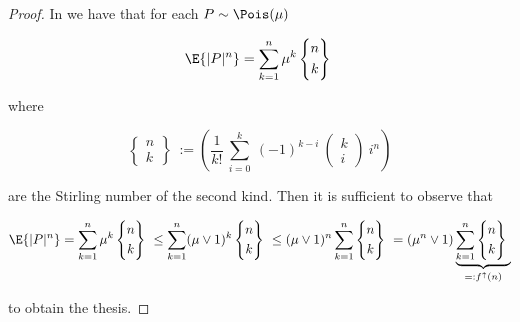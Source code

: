 \begin{proof}
	In \cite[Equation (1.3-14)]{handbook-poisson} we have that for each $P \sim \Pois(\mu)$
	
	\begin{equation*}
		\E{
			|P|^n
		}
		=
		\sum_{k=1}^{n}
		\mu^k
		\left\{
		\begin{gathered}
			n
			\\
			k
		\end{gathered}
		\right\}\
	\end{equation*}
	
	where 
	
	\begin{equation*}
		\left\{
		\begin{gathered}
			n
			\\
			k
		\end{gathered}
		\right\}\ := \left(
		\frac{1}{k!}\
		\sum_{i=0}^{k}\
		(-1)^{k-i}\
		\left(
		\begin{gathered}
			k
			\\
			i
		\end{gathered}
		\right)\
		i^n
		\right)
	\end{equation*}
	
	are the Stirling number of the second kind.
	Then it is sufficient to observe that
	
	\begin{equation*}
		\E{
			|P|^n
		}
		=
			\sum_{k=1}^{n}
			\mu^k
			\left\{
			\begin{gathered}
				n
				\\
				k
			\end{gathered}
			\right\}\
		\leq
			\sum_{k=1}^{n}
			(\mu \vee 1)^k
			\left\{
			\begin{gathered}
				n
				\\
				k
			\end{gathered}
			\right\}\
		\leq
			(\mu \vee 1)^n
			\sum_{k=1}^{n}
			\left\{
			\begin{gathered}
				n
				\\
				k
			\end{gathered}
			\right\}\		
		=
			(\mu^n \vee 1)
			\underbrace{
				\sum_{k=1}^{n}
				\left\{
				\begin{gathered}
					n
					\\
					k
				\end{gathered}
				\right\}\
			}_{=:f^{\uparrow}(n)}
	\end{equation*}
	
	to obtain the thesis.
\end{proof}

